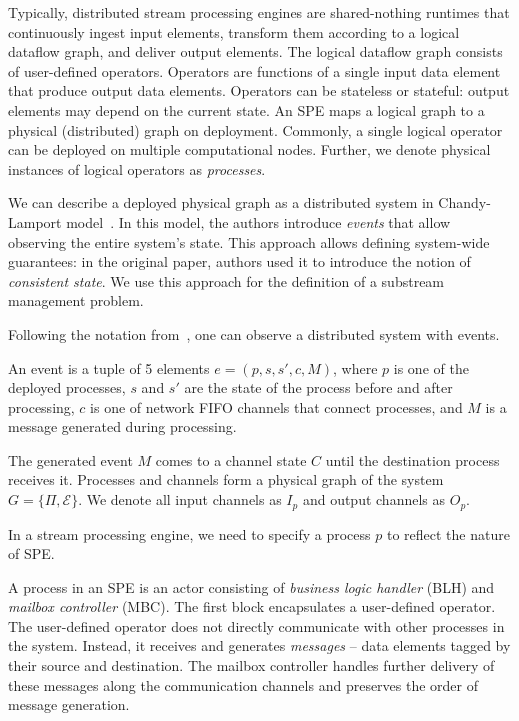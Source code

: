 Typically, distributed stream processing engines are shared-nothing runtimes that continuously ingest input elements, transform them according to a logical dataflow graph, and deliver output elements. The logical dataflow graph consists of user-defined operators. Operators are functions of a single input data element that produce output data elements. Operators can be stateless or stateful: output elements may depend on the current state. An SPE maps a logical graph to a physical (distributed) graph on deployment. Commonly, a single logical operator can be deployed on multiple computational nodes. Further, we denote physical instances of logical operators as {\em processes}.

We can describe a deployed physical graph as a distributed system in Chandy-Lamport model~\cite{Chandy:1985:DSD:214451.214456, carbone2018scalable}. In this model, the authors introduce \textit{events} that allow observing the entire system's state. This approach allows defining system-wide guarantees: in the original paper, authors used it to introduce the notion of {\em consistent state}. We use this approach for the definition of a substream management problem.

Following the notation from~\cite{Chandy:1985:DSD:214451.214456, carbone2018scalable}, one can observe a distributed system with events. 

\begin{definition}[Event]
An event is a tuple of 5 elements $e = (p, s, s', c, M)$, where $p$ is one of the deployed processes, $s$ and $s'$ are the state of the process before and after processing, $c$ is one of network FIFO channels that connect processes, and $M$ is a message generated during processing.
\end{definition}

The generated event $M$ comes to a channel state $C$ until the destination process receives it. Processes and channels form a physical graph of the system $G=\{\Pi,\mathcal{E}\}$. We denote all input channels as $I_p$ and output channels as $O_p$.

In a stream processing engine, we need to specify a process $p$ to reflect the nature of SPE. 

\begin{definition}[Process]
A process in an SPE is an actor consisting of {\em business logic handler} (BLH) and {\em mailbox controller} (MBC). The first block encapsulates a user-defined operator. The user-defined operator does not directly communicate with other processes in the system. Instead, it receives and generates {\em messages} -- data elements tagged by their source and destination. The mailbox controller handles further delivery of these messages along the communication channels and preserves the order of message generation.
\end{definition}

